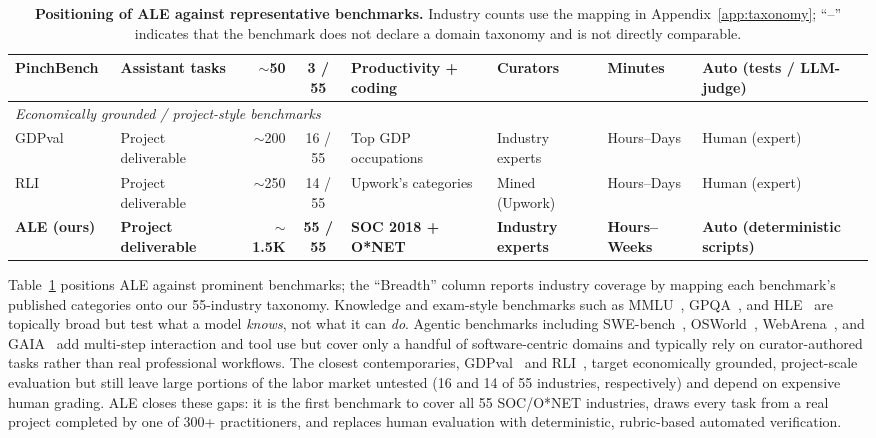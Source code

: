 \documentclass{llmxive}
\providecommand{\taskcount}{55}
\begin{document}
\begin{table}[t]
{\begin{tabular}{l l r c l l l l}
PinchBench~\citep{pinchbench2026}          & Assistant tasks    & $\sim$50  & 3 / \taskcount{}  & Productivity + coding & Curators                      & Minutes        & Auto (tests / LLM-judge) \\
\midrule
\multicolumn{8}{l}{\textit{Economically grounded / project-style benchmarks}} \\
GDPval~\citep{patwardhan2025gdpval}        & Project deliverable & $\sim$200 & 16 / \taskcount{} & Top GDP occupations  & Industry experts              & Hours--Days    & Human (expert) \\
RLI~\citep{mazeika2025rli}                 & Project deliverable & $\sim$250 & 14 / \taskcount{} & Upwork's categories & Mined (Upwork)              & Hours--Days    & Human (expert) \\
\textbf{ALE (ours)}                        & \textbf{Project deliverable} & \textbf{$\sim$1.5K} & \textbf{\taskcount{} / \taskcount{}} & \textbf{SOC 2018 + O*NET} & \textbf{Industry experts}     & \textbf{Hours--Weeks} & \textbf{Auto (deterministic scripts)} \\
\bottomrule
\end{tabular}%
}
\caption{\textbf{Positioning of ALE against representative benchmarks.} Industry counts use the mapping in
Appendix~\ref{app:taxonomy}; ``--'' indicates that the benchmark does not declare a
domain taxonomy and is not directly comparable.}
\label{tab:related-comparison}
\end{table}

Table~\ref{tab:related-comparison} positions ALE against prominent benchmarks; the ``Breadth'' column reports industry coverage by mapping each benchmark's published categories onto our \taskcount{}-industry taxonomy.
Knowledge and exam-style benchmarks such as MMLU~\citep{hendrycks2021measuring}, GPQA~\citep{rein2024gpqa}, and HLE~\citep{phan2026hle} are topically broad but test what a model \emph{knows}, not what it can \emph{do}.
Agentic benchmarks including SWE-bench~\citep{jimenez2024swebench}, OSWorld~\citep{xie2024osworld}, WebArena~\citep{zhou2024webarena}, and GAIA~\citep{mialon2024gaia} add multi-step interaction and tool use but cover only a handful of software-centric domains and typically rely on curator-authored tasks rather than real professional workflows.
The closest contemporaries, GDPval~\citep{patwardhan2025gdpval} and RLI~\citep{mazeika2025rli}, target economically grounded, project-scale evaluation but still leave large portions of the labor market untested (16 and 14 of \taskcount{} industries, respectively) and depend on expensive human grading.
ALE closes these gaps: it is the first benchmark to cover all \taskcount{} SOC/O*NET industries, draws every task from a real project completed by one of 300+ practitioners, and replaces human evaluation with deterministic, rubric-based automated verification.
\end{document}
